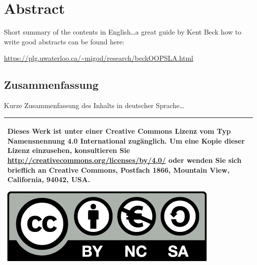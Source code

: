\begingroup
\let\clearpage\relax
\let\cleardoublepage\relax
\let\cleardoublepage\relax


\ifx\myLanguage\english

\chapter*{Abstract}
Short summary of the contents in English\dots a great guide by 
Kent Beck how to write good abstracts can be found here:  
\begin{center}
\url{https://plg.uwaterloo.ca/~migod/research/beckOOPSLA.html}
\end{center}

\vfill

\fi

\begin{otherlanguage}{ngerman}
\chapter*{Zusammenfassung}
Kurze Zusammenfassung des Inhalts in deutscher Sprache\dots 
\end{otherlanguage}

\endgroup			

\vfill

\begin{tabular}{|p{}|}
  \hline
  Dieses Werk ist unter einer Creative Commons Lizenz vom Typ Namensnennung 4.0 International zugänglich. Um eine Kopie dieser Lizenz einzusehen, konsultieren Sie \url{http://creativecommons.org/licenses/by/4.0/} oder wenden Sie sich brieflich an Creative Commons, Postfach 1866, Mountain View, California, 94042, USA.
  \begin{center}
	\includegraphics[width=.6\textwidth]{images/by-nc-sa_eu.png}
  \end{center}\\
  \hline
\end{tabular}